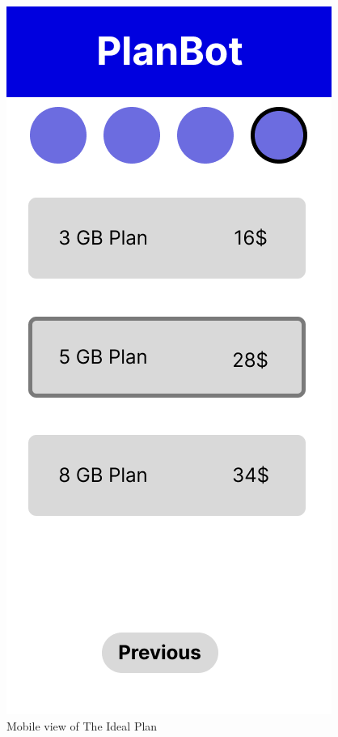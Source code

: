 \documentclass[conference]{IEEEtran}
\begin{document}
\begin{figure}[H]
    \centering
    \includegraphics[width=1\linewidth]{Mobile/Group 18MOBILE.png}
    \caption{Mobile view of The Ideal Plan }
    \label{fig:user flow}
\end{figure}
\end{document}

